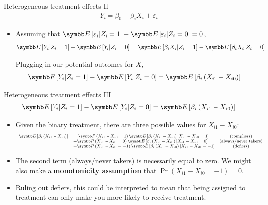 \documentclass[aspectratio=169,11pt]{beamer}
\begin{document}
\begin{frame}{Heterogeneous treatment effects II}
\begin{align*}
	Y_i = \beta_0 + \beta_i X_i + \varepsilon_i
\end{align*}

\begin{itemize}
\item Assuming that $\E\left[\varepsilon_i | Z_i = 1\right] - \E\left[\varepsilon_i | Z_i = 0\right] =0$,
\begin{align*}
\E\left[ Y_i | Z_i = 1\right] - \E\left[ Y_i | Z_i = 0\right] = \E\left[ \beta_i X_i | Z_i = 1\right] - \E\left[ \beta_i X_i | Z_i = 0\right] 
\end{align*}

\medskip
Plugging in our potential outcomes for $X$,
\begin{align*}
\E\left[ Y_i | Z_i = 1\right] - \E\left[ Y_i | Z_i = 0\right] = \E\left[ \beta_i \left(X_{i1} -X_{i0}\right) \right] 
\end{align*}
\end{itemize}
\end{frame}

\begin{frame}{Heterogeneous treatment effects III}
\begin{align*}
\E\left[ Y_i | Z_i = 1\right] - \E\left[ Y_i | Z_i = 0\right] = \E\left[ \beta_i \left(X_{i1} -X_{i0}\right) \right] 
\end{align*}

\begin{itemize}
\item Given the binary treatment, there are three possible values for $X_{i1} -X_{i0}$:
\begin{align*}
\footnotesize{
\begin{array}{llcl}
\E\left[\beta_{i}\left(X_{i1}-X_{i0}\right)\right] & =\Pr\left(X_{i1}-X_{i0}=1\right)\E\left[\beta_{i}\left(X_{i1}-X_{i0}\right)|X_{i1}-X_{i0}=1\right]  & \text{(compliers)}\\
 & +\Pr\left(X_{i1}-X_{i0}=0\right)\E\left[\beta_{i}\left(X_{i1}-X_{i0}\right)|X_{i1}-X_{i0}=0\right] & \text{(always/never takers)}\\
 & +\Pr\left(X_{i1}-X_{i0}=-1\right)\E\left[\beta_{i}\left(X_{i1}-X_{i0}\right)|X_{i1}-X_{i0}=-1\right] & \text{(defiers)}
\end{array}
}
\end{align*}


\item The second term (always/never takers) is necessarily equal to zero. We might also make a {\bf monotonicity assumption} that
	$\Pr\left(X_{i1}-X_{i0}=-1\right)=0$. 
\item Ruling out defiers, this could be interpreted to mean that 
	being assigned to treatment can only make you more likely to receive treatment.
	
\end{itemize}
\end{frame}
\end{document}
